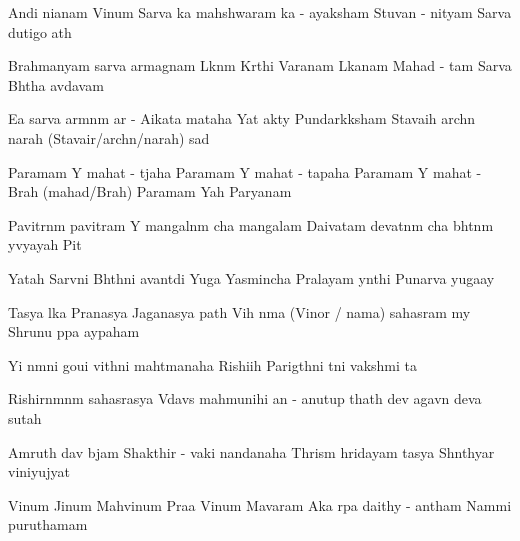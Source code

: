 \documentclass[20pt]{article}
\begin{document}
\SlokaHuge
{An{\aaa}di ni{\dhh}anam Vi{\sh}num} {Sarva {\lo}ka mah{\e}shwaram}
{{\Lo}ka - a{\dhh}yaksham Stuvan - nityam} {Sarva dutigo {\bh}a{\ve}th}

\SlokaHuge
{Brahmanyam sarva {\Dh}armagnam} {L{\oh}k{\A}n{\A}m K{\ee}rthi Var{\dhh}anam}
{L{\oh}kan{\A}{\Th}am Mahad - {\bh}{\oo}tam} {Sarva Bh{\oo}tha {\bh}av{\oh}d{\bh}avam}

\SlokaHuge
{E{\sh}a {\me} sarva {\Dh}arm{\A}n{\A}m} {{\Dh}ar{\mo} - A{\dhh}ikata{\mo} mataha}
{Yat \dsh {\bh}akty{\A} Pundar{\ee}k{\A}ksham} {Stavaih arch{\e}n narah (Stavair/arch{\e}n/narah) sad{\A}}

\novspace
\SlokaHuge
{Paramam Y{\oh} mahat - t{\e}jaha} {Paramam Y{\oh} mahat - tapaha}
{Paramam Y{\oh} mahat - Brah{\ma} (mahad/Brah{\ma})} {Paramam Yah Par{\A}yanam}

\SlokaHuge
{Pavitr{\A}n{\A}m pavitram Y{\oh}} {mangal{\A}n{\A}m cha mangalam}
{Daivatam devat{\A}n{\A}m cha} {bh{\oo}t{\A}n{\A}m y{\oh}vyayah Pit{\A}}

\SlokaHuge
{Yatah Sarv{\A}ni Bh{\oo}th{\A}ni} {{\Bh}avant{\ya}di Yu{\ga}ga{\me}}
{Yasmin{\sh}cha Pralayam y{\A}nthi} {Punar{\e}va yuga{\ksh}ay{\e}}

\SlokaHuge
{Tasya l{\oh}ka Pra{\dhh}{\A}nasya} {Jagan{\na}{\Th}asya {\Bh}{\oo}path{\e}}
{Vi{\sh}{\no}h \dsh n{\A}ma (Vi{\sh}nor / nama) sahasram m{\e}y} {Shrunu p{\A}pa {\bh}ay{\A}paham}

\novspace
\SlokaHuge
{Y{\an}i n{\A}m{\A}ni goui} {vi{\kh}{\ya}th{\A}ni mah{\A}tmanaha}
{Rishi{\bh}ih Parig{\ee}th{\A}ni} {t{\ha}ni vaksh{\ya}mi {\Bh}{\oo}ta{\ye}}

\SlokaHuge
{Rishirn{\A}mn{\A}m sahasrasya} {V{\e}dav{\ya}s{\oh} mah{\A}munihi}
{{\Ch}an{\dO} - anu{\sh}tup thath{\A} dev{\oh}} {{\Bh}agav{\A}n deva{\ki} sutah}

\SlokaHuge
{Amruth{\am} {\sh}{\oo}d{\bh}av{\oh} b{\ee}jam} {Shakthir - {\De}vaki nandanaha}
{Thris{\A}m{\A} hridayam tasya} {Sh{\aaa}nthyar{\tHe} viniyujyat{\he}}

\SlokaHuge
{Vi{\sh}num Ji{\sh}num Mah{\A}vi{\sh}num} {Pra{\bh}a Vi{\sh}num Ma{\he}{\sh}varam}
{A{\nE}ka r{\oo}pa daithy{\A} - antham} {Nam{\A}mi puru{\sho}thamam}


\end{document}
